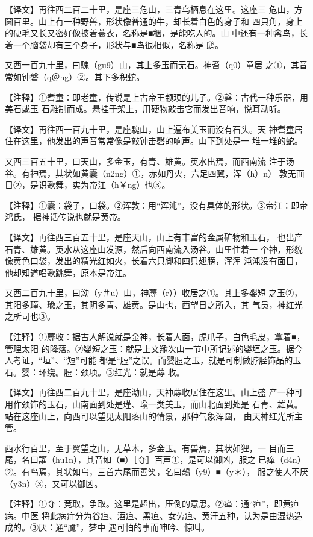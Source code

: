 \documentclass[a4paper,12pt,UTF8,twoside]{ctexbook}
\begin{document}
【译文】再往西二百二十里，是座三危山，三青鸟栖息在这里。这座三 危山，方圆百里。山上有一种野兽，形状像普通的牛，却长着白色的身子和 四只角，身上的硬毛又长又密好像披着蓑衣，名称是■秵，是能吃人的。山 中还有一种禽鸟，长着一个脑袋却有三个身子，形状与■鸟很相似，名称是 鸱。

又西一百九十里，曰騩（gu9）山，其上多玉而无石。神耆（q0）童居 之①，其音常如钟磐（q＠ng）②。其下多积蛇。

【注释】①耆童：即老童，传说是上古帝王颛顼的儿子。②磬：古代一种乐器，用美石或玉 石雕制而成。悬挂于架上，用硬物敲击它而发出音响，悦耳动听。

【译文】再往西一百九十里，是座騩山，山上遍布美玉而没有石头。天 神耆童居住在这里，他发出的声音常常像是敲钟击磬的响声。山下到处是一 堆一堆的蛇。

又西三百五十里，曰天山，多金玉，有青、雄黄。英水出焉，而西南流 注于汤谷。有神焉，其状如黄囊（n2ng）①，赤如丹火，六足四翼，浑（h）n） 敦无面目②，是识歌舞，实为帝江（h￥ng）也③。

【注释】①囊：袋子，口袋。②浑敦：用“浑沌”，没有具体的形状。③帝江：即帝鸿氏， 据神话传说也就是黄帝。

【译文】再往西三百五十里，是座天山，山上有丰富的金属矿物和玉石， 也出产石青、雄黄。英水从这座山发源，然后向西南流入汤谷。山里住着一 个神，形貌像黄色口袋，发出的精光红如火，长着六只脚和四只翅膀，浑浑 沌沌没有面目，他却知道唱歌跳舞，原本是帝江。

又西二百九十里，曰泑（y＃u）山，神蓐（r））收居之①。其上多婴短 之玉②，其阳多瑾、瑜之玉，其阴多青、雄黄。是山也，西望日之所入，其 气员，神红光之所司也③。

【注释】①蓐收：据古人解说就是金神，长着人面，虎爪子，白色毛皮，拿着■，管理太阳 的降落。②婴短之玉：就是上文羭次山一节中所记述的婴垣之玉。据今人考证，“垣”、“短”可能 都是“脰”之误。而婴脰之玉，就是可制做脖胫饰品的玉石。婴：环绕。脰：颈项。③红光：就是蓐 收。

【译文】再往西二百九十里，是座泑山，天神蓐收居住在这里。山上盛 产一种可用作颈饰的玉石，山南面到处是瑾、瑜一类美玉，而山北面到处是 石青、雄黄。站在这座山上，向西可以望见太阳落山的情景，那种气象浑圆， 由天神红光所主管。

西水行百里，至于翼望之山，无草木，多金玉。有兽焉，其状如狸，一 目而三尾，名曰讙（hu1n），其音如（■）［夺］百声①，是可以御凶，服之 已瘅（d4n）②。有鸟焉，其状如乌，三首六尾而善笑，名曰鵸（y9）■（y＊）， 服之使人不厌（y3n）③，又可以御凶。

【注释】①夺：竞取，争取。这里是超出，压倒的意思。②瘅：通“疸”，即黄疸病。中医 将此病症分为谷疸、酒疸、黑疸、女劳疸、黄汗五种，认为是由湿热造成的。③厌：通“魇”，梦中 遇可怕的事而呻吟、惊叫。
\end{document}
